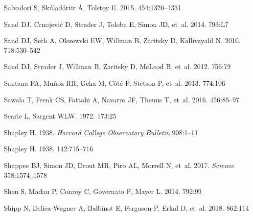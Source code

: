 \documentclass[a4paper]{ar-1col}
\begin{document}
\begin{thebibliography}{}
{Salvadori} S, {Sk{\'u}lad{\'o}ttir} {\'A}, {Tolstoy} E. 2015.
\textit{\mnras} 454:1320--1331

{Sand} DJ, {Crnojevi{\'c}} D, {Strader} J, {Toloba} E, {Simon} JD, et~al. 2014.
\textit{\apjl} 793:L7

{Sand} DJ, {Seth} A, {Olszewski} EW, {Willman} B, {Zaritsky} D, {Kallivayalil}
  N. 2010.
\textit{\apj} 718:530--542

{Sand} DJ, {Strader} J, {Willman} B, {Zaritsky} D, {McLeod} B, et~al. 2012.
\textit{\apj} 756:79

{Santana} FA, {Mu{\~n}oz} RR, {Geha} M, {C{\^o}t{\'e}} P, {Stetson} P, et~al.
  2013.
\textit{\apj} 774:106

{Sawala} T, {Frenk} CS, {Fattahi} A, {Navarro} JF, {Theuns} T, et~al. 2016.
\textit{\mnras} 456:85--97

{Searle} L, {Sargent} WLW. 1972.
\textit{\apj} 173:25

{Shapley} H. 1938{}.
\textit{Harvard College Observatory Bulletin} 908:1--11

{Shapley} H. 1938{}.
\textit{\nat} 142:715--716

{Shappee} BJ, {Simon} JD, {Drout} MR, {Piro} AL, {Morrell} N, et~al. 2017.
\textit{Science} 358:1574--1578

{Shen} S, {Madau} P, {Conroy} C, {Governato} F, {Mayer} L. 2014.
\textit{\apj} 792:99

{Shipp} N, {Drlica-Wagner} A, {Balbinot} E, {Ferguson} P, {Erkal} D, et~al.
  2018.
\textit{\apj} 862:114


\end{thebibliography}
\end{document}
